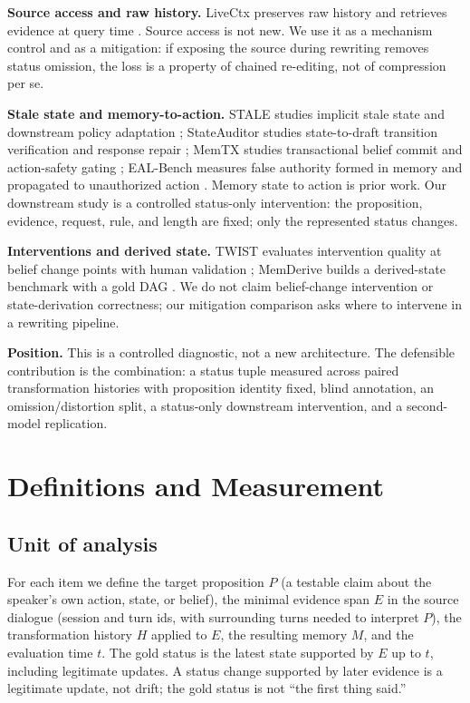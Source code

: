 \documentclass[11pt]{article}
\begin{document}
\textbf{Source access and raw history.} LiveCtx preserves raw history and
retrieves evidence at query time \citep{livectx}. Source access is not new. We
use it as a mechanism control and as a mitigation: if exposing the source during
rewriting removes status omission, the loss is a property of chained re-editing,
not of compression per se.

\textbf{Stale state and memory-to-action.} STALE studies implicit stale state and
downstream policy adaptation \citep{stale}; StateAuditor studies state-to-draft
transition verification and response repair \citep{stateauditor}; MemTX studies
transactional belief commit and action-safety gating \citep{memtx}; EAL-Bench
measures false authority formed in memory and propagated to unauthorized action
\citep{ealbench}. Memory state to action is prior work. Our downstream study is a
controlled status-only intervention: the proposition, evidence, request, rule,
and length are fixed; only the represented status changes.

\textbf{Interventions and derived state.} TWIST evaluates intervention quality at
belief change points with human validation \citep{twist}; MemDerive builds a
derived-state benchmark with a gold DAG \citep{memderive}. We do not claim
belief-change intervention or state-derivation correctness; our mitigation
comparison asks where to intervene in a rewriting pipeline.

\textbf{Position.} This is a controlled diagnostic, not a new architecture. The
defensible contribution is the combination: a status tuple measured across
paired transformation histories with proposition identity fixed, blind
annotation, an omission/distortion split, a status-only downstream intervention, and
a second-model replication.

\section{Definitions and Measurement}

\subsection{Unit of analysis}

For each item we define the target proposition $P$ (a testable claim about the
speaker's own action, state, or belief), the minimal evidence span $E$ in the
source dialogue (session and turn ids, with surrounding turns needed to
interpret $P$), the transformation history $H$ applied to $E$, the resulting
memory $M$, and the evaluation time $t$. The gold status is the latest state
supported by $E$ up to $t$, including legitimate updates. A status change
supported by later evidence is a legitimate update, not drift; the gold status
is not ``the first thing said.''
\end{document}
